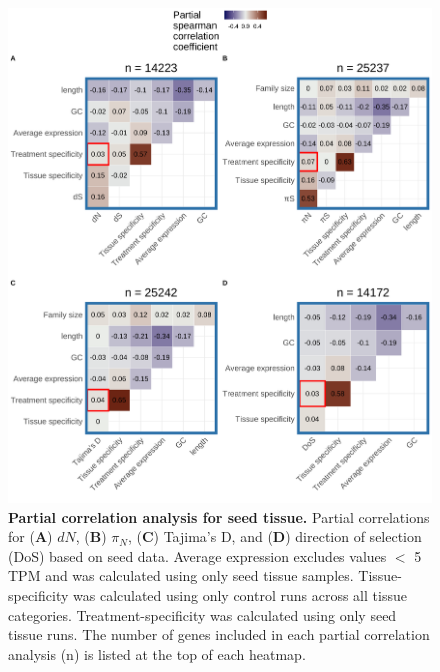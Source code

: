\documentclass[12pt]{article}
\begin{document}
\begin{figure}[H]
\centering
\includegraphics[width = \linewidth]{figures/appendix_a/partialCorrelations_withTissueSpecificity_seed_2023-02-20.pdf}
\caption{\textbf{Partial correlation analysis for seed tissue.} Partial correlations for (\textbf{A}) $dN$, (\textbf{B}) $\pi_N$, (\textbf{C}) Tajima's D, and (\textbf{D}) direction of selection (DoS) based on seed data. Average expression excludes values $<$ 5 TPM and was calculated using only seed tissue samples. Tissue-specificity was calculated using only control runs across all tissue categories. Treatment-specificity was calculated using only seed tissue runs. The number of genes included in each partial correlation analysis (n) is listed at the top of each heatmap.}%
\end{figure}

\newpage
\end{document}
